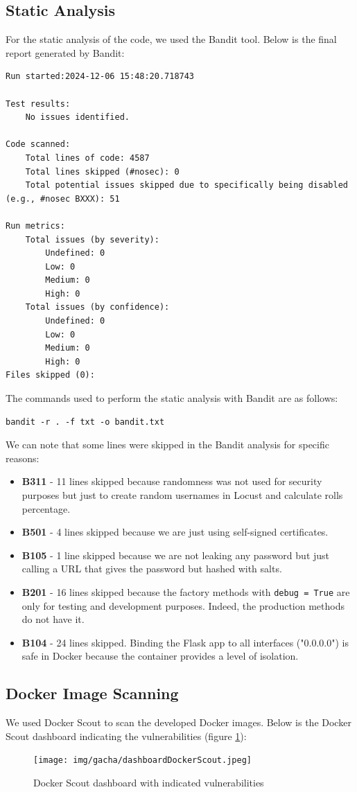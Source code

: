 \documentclass{article}
\begin{document}
\subsection{Static Analysis}
For the static analysis of the code, we used the Bandit tool. Below is the final report generated by Bandit:
\begin{verbatim}
Run started:2024-12-06 15:48:20.718743

Test results:
	No issues identified.

Code scanned:
	Total lines of code: 4587
	Total lines skipped (#nosec): 0
	Total potential issues skipped due to specifically being disabled (e.g., #nosec BXXX): 51

Run metrics:
	Total issues (by severity):
		Undefined: 0
		Low: 0
		Medium: 0
		High: 0
	Total issues (by confidence):
		Undefined: 0
		Low: 0
		Medium: 0
		High: 0
Files skipped (0):
\end{verbatim}

The commands used to perform the static analysis with Bandit are as follows:
\begin{verbatim}
bandit -r . -f txt -o bandit.txt
\end{verbatim}

We can note that some lines were skipped in the Bandit analysis for specific reasons:

\begin{itemize}
    \item \textbf{B311} - 11 lines skipped because randomness was not used for security purposes but just to create random usernames in Locust and calculate rolls percentage.
    \item \textbf{B501} - 4 lines skipped because we are just using self-signed certificates.
    \item \textbf{B105} - 1 line skipped because we are not leaking any password but just calling a URL that gives the password but hashed with salts.
    \item \textbf{B201} - 16 lines skipped because the factory methods with \texttt{debug = True} are only for testing and development purposes. Indeed, the production methods do not have it.
    \item \textbf{B104} - 24 lines skipped. Binding the Flask app to all interfaces ("0.0.0.0") is safe in Docker because the container provides a level of isolation.
\end{itemize}

\subsection{Docker Image Scanning}
We used Docker Scout to scan the developed Docker images. Below is the Docker Scout dashboard indicating the vulnerabilities (figure \ref{fig:docker_scout_dashboard}):
\begin{figure}[h]
    \centering
    \texttt{[image: img/gacha/dashboardDockerScout.jpeg]}
    \caption{Docker Scout dashboard with indicated vulnerabilities}
    \label{fig:docker_scout_dashboard}
\end{figure}
\end{document}
